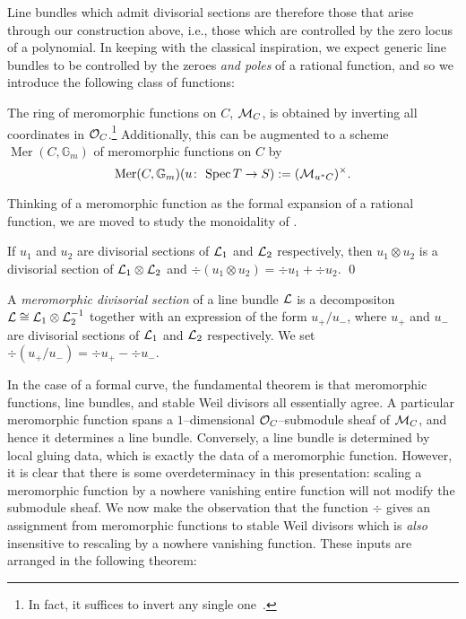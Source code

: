 Line bundles which admit divisorial sections are therefore those that arise through our construction above, i.e., those which are controlled by the zero locus of a polynomial.  In keeping with the classical inspiration, we expect generic line bundles to be controlled by the zeroes \emph{and poles} of a rational function, and so we introduce the following class of functions:

\begin{definition}
The ring of meromorphic functions on \(C\), \(\mathcal{M}_C\), is obtained by inverting all coordinates in \(\mathcal{O}_C\).\footnote{In fact, it suffices to invert any single one~\cite[Lemma 5.21]{StricklandFSFG}.}  Additionally, this can be augmented to a scheme \(\operatorname{Mer}(C, \mathbb G_m)\) of meromorphic functions on \(C\) by \[\operatorname{Mer}(C, \mathbb G_m)(u\colon\thinspace \operatorname{Spec} T \to S) := (\mathcal{M}_{u^* C})^\times.\]
\end{definition}

Thinking of a meromorphic function as the formal expansion of a rational function, we are moved to study the monoidality of .

\begin{lemma}
If \(u_1\) and \(u_2\) are divisorial sections of \(\mathcal{L}_1\) and \(\mathcal{L}_2\) respectively, then \(u_1 \otimes u_2\) is a divisorial section of \(\mathcal{L}_1 \otimes \mathcal{L}_2\) and \(\div(u_1 \otimes u_2) = \div u_1 + \div u_2\). \qed
\end{lemma}

\begin{definition}
A \textit{meromorphic divisorial section} of a line bundle \(\mathcal{L}\) is a decompositon \(\mathcal{L} \cong \mathcal{L}_1 \otimes \mathcal{L}_2^{-1}\) together with an expression of the form \(u_+ / u_-\), where \(u_+\) and \(u_-\) are divisorial sections of \(\mathcal{L}_1\) and \(\mathcal{L}_2\) respectively.  We set \(\div(u_+ / u_-) = \div u_+ - \div u_-\).
\end{definition}

In the case of a formal curve, the fundamental theorem is that meromorphic functions, line bundles, and stable Weil divisors all essentially agree.  A particular meromorphic function spans a \(1\)--dimensional \(\mathcal{O}_C\)--submodule sheaf of \(\mathcal{M}_C\), and hence it determines a line bundle.  Conversely, a line bundle is determined by local gluing data, which is exactly the data of a meromorphic function.  However, it is clear that there is some overdeterminacy in this presentation: scaling a meromorphic function by a nowhere vanishing entire function will not modify the submodule sheaf.  We now make the observation that the function \(\div\) gives an assignment from meromorphic functions to stable Weil divisors which is \emph{also} insensitive to rescaling by a nowhere vanishing function.  These inputs are arranged in the following theorem:

